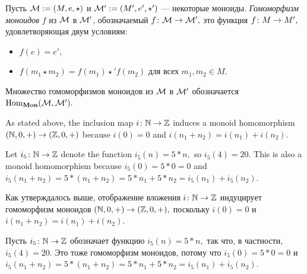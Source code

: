 \documentclass[../main/CT4S-EN-RU]{subfiles}
\begin{document}
\begin{definitionRUS}\label{def:monoid hom}
Пусть $\mathcal{M}:=(M,e,\star)$ и $\mathcal{M}':=(M',e',\star')$ — некоторые моноиды. {\em Гомоморфизм моноидов} $f$ из $\mathcal{M}$ в $\mathcal{M}'$, обозначаемый $f\colon\mathcal{M}\rightarrow\mathcal{M}',$ это функция $f\colon M\rightarrow M',$ удовлетворяющая двум условиям:
\begin{itemize}
\item $f(e)=e',$
\item $f(m_1\star m_2)=f(m_1)\star'f(m_2)$ для всех $m_1,m_2\in M.$
\end{itemize}
Множество гомоморфизмов моноидов из $\mathcal{M}$ в $\mathcal{M}'$ обозначается $\operatorname{Hom}_{{\mathbf{Mon}}}(\mathcal{M},\mathcal{M}').$
\end{definitionRUS}

\begin{exampleENG}[From $\NN$ to $\ZZ$]\label{ex:nat to int}
As stated above, the inclusion map $i\colon{\mathbb N}\rightarrow{\mathbb Z}$ induces a monoid homomorphism $({\mathbb N},0,+)\rightarrow({\mathbb Z},0,+)$ because $i(0)=0$ and $i(n_1+n_2)=i(n_1)+i(n_2).$

Let $i_5\colon{\mathbb N}\rightarrow{\mathbb Z}$ denote the function $i_5(n)=5*n,$ so $i_5(4)=20.$ This is also a monoid homomorphism because $i_5(0)=5*0=0$ and $i_5(n_1+n_2)=5*(n_1+n_2)=5*n_1+5*n_2=i_5(n_1)+i_5(n_2).$
\end{exampleENG}

\begin{exampleRUS}[Из $\NN$ в $\ZZ$]\label{ex:nat to int}
Как утверждалось выше, отображение вложения $i\colon{\mathbb N}\rightarrow{\mathbb Z}$ индуцирует гомоморфизм моноидов $({\mathbb N},0,+)\rightarrow({\mathbb Z},0,+),$ поскольку $i(0)=0$ и $i(n_1+n_2)=i(n_1)+i(n_2).$

Пусть $i_5\colon{\mathbb N}\rightarrow{\mathbb Z}$ обозначает функцию $i_5(n)=5*n,$ так что, в частности, $i_5(4)=20.$ Это тоже гомоморфизм моноидов, потому что $i_5(0)=5*0=0$ и $i_5(n_1+n_2)=5*(n_1+n_2)=5*n_1+5*n_2=i_5(n_1)+i_5(n_2).$
\end{exampleRUS}
\end{document}
